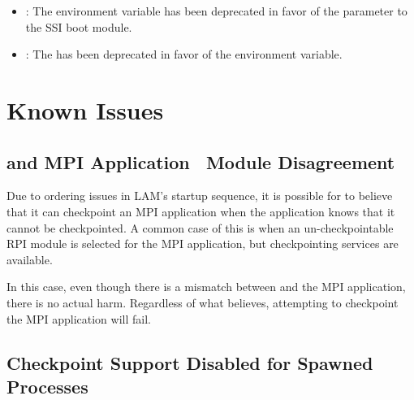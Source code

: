\begin{itemize}
  \begin{itemize}
  \item {}: The  environment variable
    has been deprecated in favor of the
     parameter to the  SSI
    boot module.
    
  \item {}: The
     has been deprecated in
    favor of the  environment
    variable.
  \end{itemize}
\end{itemize}


\section{Known Issues}



\subsection{ and MPI Application \ Module Disagreement}

Due to ordering issues in LAM's  startup
sequence, it is possible for  to believe that it can
checkpoint an MPI application when the application knows that it
cannot be checkpointed.  A common case of this is when an
un-checkpointable RPI module is selected for the MPI application, but
checkpointing services are available.

In this case, even though there is a mismatch between  and
the MPI application, there is no actual harm.  Regardless of what
 believes, attempting to checkpoint the MPI application
will fail.


\subsection{Checkpoint Support Disabled for Spawned Processes}

